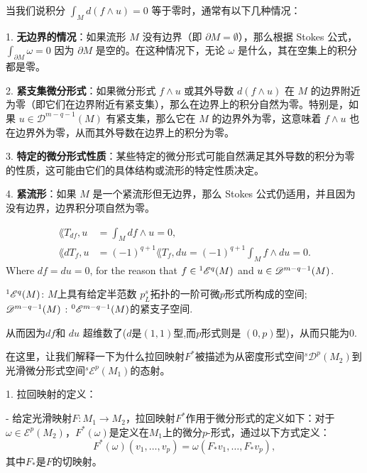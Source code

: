 \documentclass[lang=cn,zihao=-4,a4paper,fontset=none]{beautybook}
\begin{document}
当我们说积分 $\int_M d(f \wedge u) = 0$ 等于零时，通常有以下几种情况：

1. \textbf{无边界的情况}：如果流形 $M$ 没有边界（即 $\partial M = \emptyset$），那么根据 Stokes 公式，$\int_{\partial M} \omega = 0$ 因为 $\partial M$ 是空的。在这种情况下，无论 $\omega$ 是什么，其在空集上的积分都是零。

2. \textbf{紧支集微分形式}：如果微分形式 $f \wedge u$ 或其外导数 $d(f \wedge u)$ 在 $M$ 的边界附近为零（即它们在边界附近有紧支集），那么在边界上的积分自然为零。特别是，如果 $u \in \mathscr{D}^{m-q-1}(M)$ 有紧支集，那么它在 $M$ 的边界外为零，这意味着 $f \wedge u$ 也在边界外为零，从而其外导数在边界上的积分为零。

3. \textbf{特定的微分形式性质}：某些特定的微分形式可能自然满足其外导数的积分为零的性质，这可能由它们的具体结构或流形的特定性质决定。

4. \textbf{紧流形}：如果 $M$ 是一个紧流形但无边界，那么 Stokes 公式仍适用，并且因为没有边界，边界积分项自然为零。
\begin{fancybox}
\begin{align*}
    \lang{T_{df} ,u} &= \int_M df\wedge u=0,\\ 
\lang{dT_f,u} &=(-1)^{q+1}\lang{T_f,du}=(-1)^{q+1}\int_M f\wedge du=0.
\end{align*}
    Where $df=du=0$, for the reason that $f\in {}^1{\mathscr E}^q(M)$ and $u\in {\mathscr D}^{m-q-1}(M)$.
\end{fancybox}
\begin{remark}
    ${}^1{\mathscr E}^q(M)$: $M$上具有给定半范数 $p^s_L$拓扑的一阶可微$p$形式所构成的空间;
    ${\mathscr D}^{m-q-1}(M)$ : ${}^0{\mathscr E}^{m-q-1}(M)$的紧支子空间.

从而因为$df$和 $du$ 超维数了($d$是$(1,1)$型,而$p$形式则是 $(0,p)$型)，从而只能为$0$.
\end{remark}


在这里，让我们解释一下为什么拉回映射$F^*$被描述为从密度形式空间$^s\mathscr{D}^p(M_2)$到光滑微分形式空间$^s\mathscr{E}^p(M_1)$的态射。

1. 拉回映射的定义：

   - 给定光滑映射$F: M_1 \to M_2$，拉回映射$F^*$作用于微分形式的定义如下：对于$\omega \in \mathscr{E}^p(M_2)$，$F^*(\omega)$是定义在$M_1$上的微分$p$-形式，通过以下方式定义：$$F^*(\omega)(v_1, \ldots, v_p) = \omega(F_*v_1, \ldots, F_*v_p),$$ 其中$F_*$是$F$的切映射。
\end{document}
